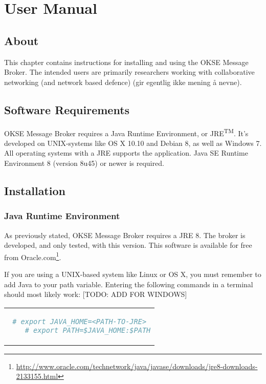 \chapter{User Manual}

\section{About}

This chapter contains instructions for installing and using the OKSE Message Broker. The intended users are primarily researchers working with collaborative networking (and network based defence) (gir egentlig ikke mening å nevne). 

\section{Software Requirements}

OKSE Message Broker requires a Java Runtime Environment, or JRE\textsuperscript{TM}. It's developed on UNIX-systems like OS X 10.10 and Debian 8, as well as Windows 7. All operating systems with a JRE supports the application. Java SE Runtime Environment 8 (version 8u45) or newer is required. 

\section{Installation}

\subsection{Java Runtime Environment}

As previously stated, OKSE Message Broker requires a JRE 8. The broker is developed, and only tested, with this version. This software is available for free from Oracle.com\footnote{\url{http://www.oracle.com/technetwork/java/javase/downloads/jre8-downloads-2133155.html}}.

If you are using a UNIX-based system like Linux or OS X, you must remember to add Java to your path variable. Entering the following commands in a terminal should most likely work: [TODO: ADD FOR WINDOWS]

\begin{center}
\begin{tabular}{c}
\begin{lstlisting}[language=bash]
    # export JAVA_HOME=<PATH-TO-JRE>
    # export PATH=$JAVA_HOME:$PATH
\end{lstlisting}
\end{tabular}
\end{center}

